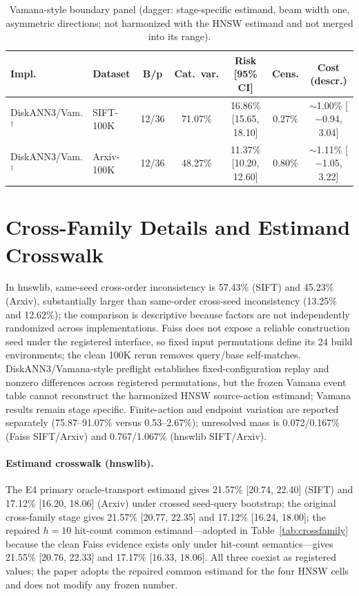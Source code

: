 \documentclass{article}
\begin{document}
\begin{table}[t]
\centering
\caption{Vamana-style boundary panel (dagger: stage-specific estimand, beam width one, asymmetric
directions; not harmonized with the HNSW estimand and not merged into its range).}
\label{tab:vamana}
\footnotesize
\setlength{\tabcolsep}{2.6pt}
\begin{tabular}{llccccc}
\toprule
Impl. & Dataset & B/p & Cat.\ var. & Risk [95\% CI] & Cens. & Cost (descr.) \\
\midrule
DiskANN3/Vam.$^\dagger$ & SIFT-100K & 12/36 & 71.07\% & 16.86\% {\tiny[15.65, 18.10]} & 0.27\% & $\sim$1.00\% {\tiny[$-$0.94, 3.04]} \\
DiskANN3/Vam.$^\dagger$ & Arxiv-100K & 12/36 & 48.27\% & 11.37\% {\tiny[10.20, 12.60]} & 0.80\% & $\sim$1.11\% {\tiny[$-$1.05, 3.22]} \\
\bottomrule
\end{tabular}
\end{table}

\section{Cross-Family Details and Estimand Crosswalk}
\label{app:crossfamily}

In hnswlib, same-seed cross-order inconsistency is 57.43\% (SIFT) and 45.23\% (Arxiv), substantially larger
than same-order cross-seed inconsistency (13.25\% and 12.62\%); the comparison is descriptive because
factors are not independently randomized across implementations. Faiss does not expose a reliable
construction seed under the registered interface, so fixed input permutations define its 24 build
environments; the clean 100K rerun removes query/base self-matches. DiskANN3/Vamana-style preflight
establishes fixed-configuration replay and nonzero differences across registered permutations, but the
frozen Vamana event table cannot reconstruct the harmonized HNSW source-action estimand; Vamana results
remain stage specific. Finite-action and endpoint variation are reported separately (75.87--91.07\% versus
0.53--2.67\%); unresolved mass is 0.072/0.167\% (Faiss SIFT/Arxiv) and 0.767/1.067\% (hnswlib SIFT/Arxiv).

\paragraph{Estimand crosswalk (hnswlib).}
The E4 primary oracle-transport estimand gives 21.57\% [20.74, 22.40] (SIFT) and 17.12\% [16.20, 18.06]
(Arxiv) under crossed seed-query bootstrap; the original cross-family stage gives 21.57\% [20.77, 22.35]
and 17.12\% [16.24, 18.00]; the repaired $h{=}10$ hit-count common estimand---adopted in
Table~\ref{tab:crossfamily} because the clean Faiss evidence exists only under hit-count semantics---gives
21.55\% [20.76, 22.33] and 17.17\% [16.33, 18.06]. All three coexist as registered values; the paper adopts
the repaired common estimand for the four HNSW cells and does not modify any frozen number.
\end{document}

